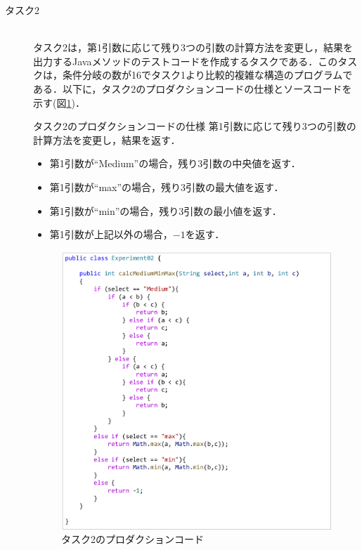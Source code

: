 \documentclass[12pt]{jarticle} %
\begin{document}
\begin{description}
\item[タスク2]~\\
タスク2は，第1引数に応じて残り3つの引数の計算方法を変更し，結果を出力するJavaメソッドのテストコードを作成するタスクである．このタスクは，条件分岐の数が16でタスク1より比較的複雑な構造のプログラムである．以下に，タスク2のプロダクションコードの仕様とソースコードを示す(図\ref{E2})．

\begin{itembox}[l]{タスク2のプロダクションコードの仕様}
第1引数に応じて残り3つの引数の計算方法を変更し，結果を返す．
\begin{itemize}
\item 第1引数が``Medium''の場合，残り3引数の中央値を返す．
\item 第1引数が``max''の場合，残り3引数の最大値を返す．
\item 第1引数が``min''の場合，残り3引数の最小値を返す．
\item 第1引数が上記以外の場合，$-1$を返す．
\end{itemize}
\end{itembox}

\begin{figure}[htbp]
\begin{center}
\includegraphics[clip,width=13cm]{image/E2.pdf}
\caption{タスク2のプロダクションコード}
\label{E2}
\end{center}
\end{figure}



\end{description}
\end{document}
